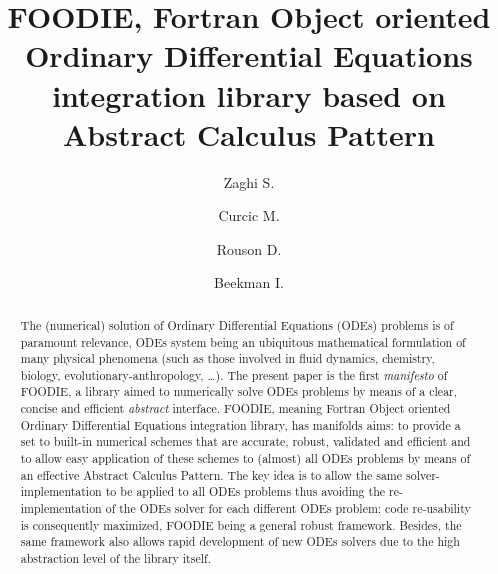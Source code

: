 \documentclass[pdftex,preprint,3p,times,numbers]{elsarticle}
\begin{document}
\begin{frontmatter}

\title{FOODIE, Fortran Object oriented Ordinary Differential Equations integration library based on Abstract Calculus Pattern}

\author[insean]{Zaghi S.}
\address[insean]{CNR-INSEAN, Istituto Nazionale per Studi ed Esperienze di Architettura Navale, Via di Vallerano 139, Rome, Italy, 00128}

\author[rsmas]{Curcic M.}
\address[rsmas]{Ocean Sciences Rosenstiel School of Marine and Atmospheric Science, University of Miami, 4600 Rickenbacker Causeway Miami, FL 33149-1098 +1 305.421.4000}

\author[sourcery]{Rouson D.}
\address[sourcery]{Sourcery Institute 482 Michigan Ave., Berkeley, CA 94707}

\author[sourcery]{Beekman I.}

\begin{abstract}
The (numerical) solution of Ordinary Differential Equations (ODEs) problems is of paramount relevance, ODEs system being an ubiquitous mathematical formulation of many physical phenomena (such as those involved in fluid dynamics, chemistry, biology, evolutionary-anthropology, \dots). The present paper is the first \emph{manifesto} of FOODIE, a library aimed to numerically solve ODEs problems by means of a clear, concise and efficient \emph{abstract} interface. FOODIE, meaning Fortran Object oriented Ordinary Differential Equations integration library, has manifolds aims: to provide a set to built-in numerical schemes that are accurate, robust, validated and efficient and to allow easy application of these schemes to (almost) all ODEs problems by means of an effective Abstract Calculus Pattern. The key idea is to allow the same solver-implementation to be applied to all ODEs problems thus avoiding the re-implementation of the ODEs solver for each different ODEs problem: code re-usability is consequently maximized, FOODIE being a general robust framework. Besides, the same framework also allows rapid development of new ODEs solvers due to the high abstraction level of the library itself.


\end{abstract}
\end{frontmatter}
\end{document}
